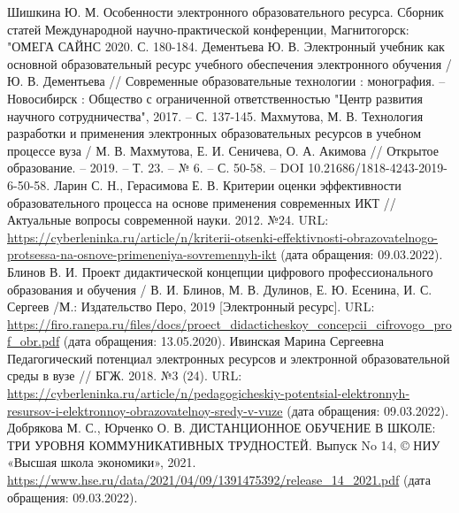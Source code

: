 \begin{thebibliography}{99}
  Шишкина  Ю. М. Особенности электронного образовательного ресурса. Сборник статей Международной научно-практической конференции, Магнитогорск: "ОМЕГА САЙНС 2020. С. 180-184.
  Дементьева Ю. В. Электронный учебник как основной образовательный ресурс учебного обеспечения электронного обучения / Ю. В. Дементьева // Современные образовательные технологии : монография. – Новосибирск : Общество с ограниченной ответственностью "Центр развития научного сотрудничества", 2017. – С. 137-145.
  Махмутова, М. В. Технология разработки и применения электронных образовательных ресурсов в учебном процессе вуза / М. В. Махмутова, Е. И. Сеничева, О. А. Акимова // Открытое образование. – 2019. – Т. 23. – № 6. – С. 50-58. – DOI 10.21686/1818-4243-2019-6-50-58.
 Ларин С. Н., Герасимова Е. В. Критерии оценки эффективности образовательного процесса на основе применения современных ИКТ // Актуальные вопросы современной науки. 2012. №24. URL: \url{https://cyberleninka.ru/article/n/kriterii-otsenki-effektivnosti-obrazovatelnogo-protsessa-na-osnove-primeneniya-sovremennyh-ikt} (дата обращения: 09.03.2022).
 Блинов В. И. Проект дидактической концепции цифрового профессионального образования и обучения / В. И. Блинов, М. В. Дулинов, Е. Ю. Есенина, И. С. Сергеев /М.: Издательство Перо, 2019 [Электронный ресурс]. URL: \url{https://firo.ranepa.ru/files/docs/proect_didacticheskoy_concepcii_cifrovogo_prof_obr.pdf} (дата обращения: 13.05.2020).
 Ивинская Марина Сергеевна Педагогический потенциал электронных ресурсов и электронной образовательной среды в вузе // БГЖ. 2018. №3 (24). URL: \url{https://cyberleninka.ru/article/n/pedagogicheskiy-potentsial-elektronnyh-resursov-i-elektronnoy-obrazovatelnoy-sredy-v-vuze} (дата обращения: 09.03.2022).
 Добрякова М. С.,  Юрченко О. В. ДИСТАНЦИОННОЕ ОБУЧЕНИЕ В ШКОЛЕ: ТРИ УРОВНЯ КОММУНИКАТИВНЫХ ТРУДНОСТЕЙ. Выпуск No 14, © НИУ «Высшая школа экономики», 2021. \url{https://www.hse.ru/data/2021/04/09/1391475392/release_14_2021.pdf} (дата обращения: 09.03.2022).
\end{thebibliography}
